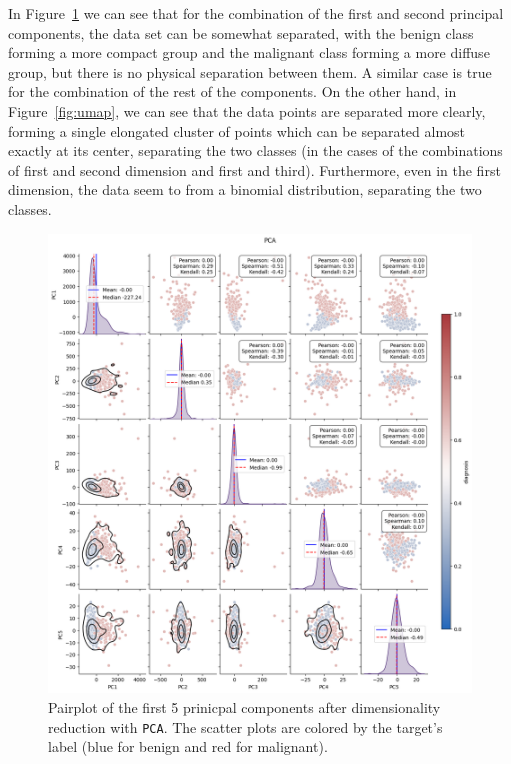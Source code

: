\documentclass[12pt]{article}
\begin{document}
In Figure~\ref{fig:pca} we can see that for the combination of the first and
second principal components, the data set can be somewhat separated, with the
benign class forming a more compact group and the malignant class forming a more
diffuse group, but there is no physical separation between them. A similar
case is true for the combination of the rest of the components. On the other
hand, in Figure~\ref{fig:umap}, we can see that the data points are separated
more clearly, forming a single elongated cluster of points which can be
separated almost exactly at its center, separating the two classes (in the
cases of the combinations of first and second dimension and first and third).
Furthermore, even in the first dimension, the data seem to from a binomial
distribution, separating the two classes.

\begin{figure}[H]
    \centering
    \includegraphics[width=\textwidth]{ims/pca.png}
    \caption{Pairplot of the first 5 prinicpal components after dimensionality
    reduction with \texttt{PCA}. The scatter plots are colored by the target's
    label (blue for benign and red for malignant).}
    \label{fig:pca}
\end{figure}
\end{document}
